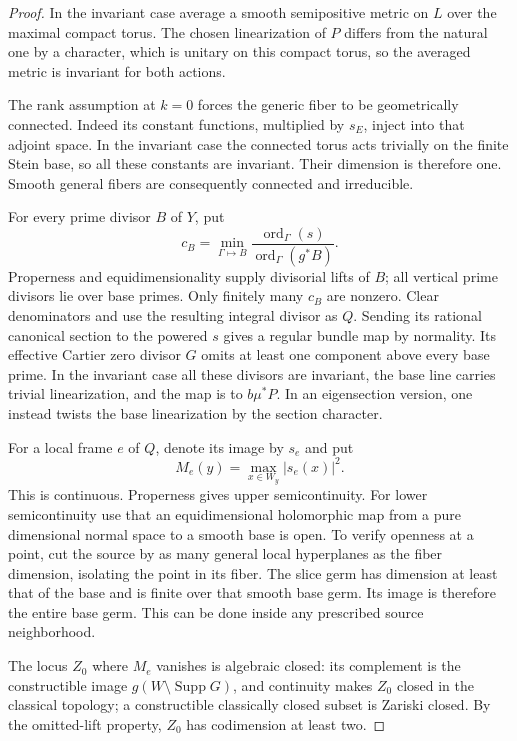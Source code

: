 \begin{proof}
In the invariant case average a smooth semipositive metric on $L$ over
the maximal compact torus. The chosen linearization of $P$ differs
from the natural one by a character, which is unitary on this compact
torus, so the averaged metric is invariant for both actions.

The rank assumption at $k=0$ forces the generic fiber to be geometrically connected. Indeed its constant functions, multiplied by $s_E$, inject into that adjoint space. In the invariant case the connected torus acts trivially on the finite Stein base, so all these constants are invariant. Their dimension is therefore one. Smooth general fibers are consequently connected and irreducible.

For every prime divisor \(B\) of \(Y\), put
\[
 c_B=\min_{\Gamma\mapsto B}
       \frac{\operatorname{ord}_{\Gamma}(s)}
            {\operatorname{ord}_{\Gamma}(g^*B)}.
\]
Properness and equidimensionality supply divisorial lifts of \(B\);
all vertical prime divisors lie over base primes. Only finitely many
\(c_B\) are nonzero. Clear denominators and use the resulting integral
divisor as \(Q\). Sending its rational canonical section to the powered
\(s\) gives a regular bundle map by normality. Its effective Cartier
zero divisor \(G\) omits at least one component above every base prime.
In the invariant case all these divisors are invariant, the base line carries trivial linearization, and the map is to \(b\mu^*P\). In an eigensection version, one
instead twists the base linearization by the section character.

For a local frame \(e\) of \(Q\), denote its image by \(s_e\) and put
\begin{equation}\label{har:eq:max}
 M_e(y)=\max_{x\in W_y}|s_e(x)|^2.
\end{equation}
This is continuous. Properness gives upper semicontinuity. For lower
semicontinuity use that an equidimensional holomorphic map from a pure
dimensional normal space to a smooth base is open. To verify openness
at a point, cut the source by as many general local hyperplanes as the
fiber dimension, isolating the point in its fiber. The slice germ has
dimension at least that of the base and is finite over that smooth
base germ. Its image is therefore the entire base germ. This can be
done inside any prescribed source neighborhood.

The locus \(Z_0\) where \(M_e\) vanishes is algebraic closed: its
complement is the constructible image \(g(W\setminus\operatorname{Supp}G)\),
and continuity makes \(Z_0\) closed in the classical topology; a constructible
classically closed subset is Zariski closed. By the omitted-lift
property, \(Z_0\) has codimension at least two.


\end{proof}
